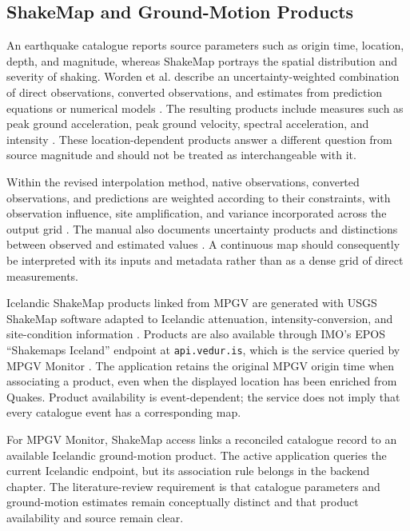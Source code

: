 \documentclass[12pt]{article}
\begin{document}
\subsection{ShakeMap and Ground-Motion Products}

An earthquake catalogue reports source parameters such as origin time, location, depth, and magnitude, whereas ShakeMap portrays the spatial distribution and severity of shaking. Worden et al. describe an uncertainty-weighted combination of direct observations, converted observations, and estimates from prediction equations or numerical models \cite[p.~3083]{Worden2010}. The resulting products include measures such as peak ground acceleration, peak ground velocity, spectral acceleration, and intensity \cite{ShakeMapManual}. These location-dependent products answer a different question from source magnitude and should not be treated as interchangeable with it.

Within the revised interpolation method, native observations, converted observations, and predictions are weighted according to their constraints, with observation influence, site amplification, and variance incorporated across the output grid \cite[pp.~3084--3087]{Worden2010}. The manual also documents uncertainty products and distinctions between observed and estimated values \cite{ShakeMapManual}. A continuous map should consequently be interpreted with its inputs and metadata rather than as a dense grid of direct measurements.

Icelandic ShakeMap products linked from MPGV are generated with USGS ShakeMap software adapted to Icelandic attenuation, intensity-conversion, and site-condition information \cite{imo_mpgv_archive,imo_mpgv_archive_index}. Products are also available through IMO's EPOS \enquote{Shakemaps Iceland} endpoint at \texttt{api.vedur.is}, which is the service queried by MPGV Monitor \cite{imo_epos_api}. The application retains the original MPGV origin time when associating a product, even when the displayed location has been enriched from Quakes. Product availability is event-dependent; the service does not imply that every catalogue event has a corresponding map.

For MPGV Monitor, ShakeMap access links a reconciled catalogue record to an available Icelandic ground-motion product. The active application queries the current Icelandic endpoint, but its association rule belongs in the backend chapter. The literature-review requirement is that catalogue parameters and ground-motion estimates remain conceptually distinct and that product availability and source remain clear.
\end{document}
